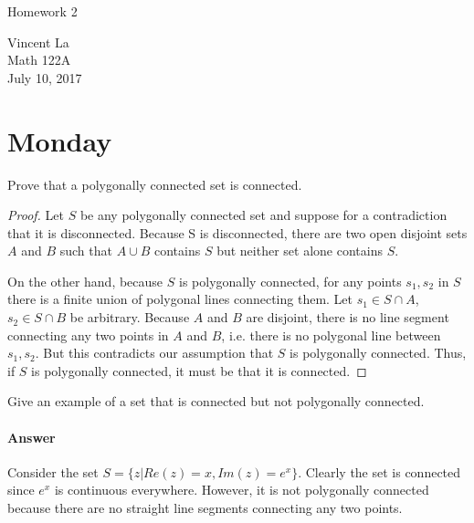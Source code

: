 \documentclass[11pt]{article}
\title{ }
\begin{document}
	\begin{center}	%
		\Large{Homework 2}	%
	\end{center}
	\begin{center}
		Vincent La \\
		Math 122A \\
		July 10, 2017
	\end{center}

\section*{Monday}
\begin{enumerate}
	\item[1.22.] Prove that a polygonally connected set is connected.
	
	\begin{proof}
		\item Let $S$ be any polygonally connected set and suppose for a contradiction that it is disconnected. Because S is disconnected, there are two open disjoint sets $A$ and $B$ such that $A \cup B$ contains $S$ but neither set alone contains $S$.
		
		\bigskip
		
		On the other hand, because $S$ is polygonally connected, for any points $s_1, s_2$ in $S$ there is a finite union of polygonal lines connecting them. Let $s_1 \in S \cap A$, $s_2 \in S \cap B$ be arbitrary. Because $A$ and $B$ are disjoint, there is no line segment connecting any two points in $A$ and $B$, i.e. there is no polygonal line between $s_1, s_2$. But this contradicts our assumption that $S$ is polygonally connected. Thus, if $S$ is polygonally connected, it must be that it is connected.
	\end{proof}

	\item[Extra 3.] Give an example of a set that is connected but not polygonally connected.
	
	\paragraph{Answer} Consider the set $S = \{z | Re(z) = x, Im(z) = e^x \}$. Clearly the set is connected since $e^x$ is continuous everywhere. However, it is not polygonally connected because there are no straight line segments connecting any two points.
\end{enumerate}
\end{document}
